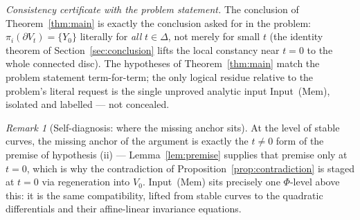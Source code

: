 \documentclass[11pt]{article}
\theoremstyle{definition}
\theoremstyle{remark}
\newtheorem{rmk}[thm]{Remark}
\begin{document}
\emph{Consistency certificate with the problem statement.} The
conclusion of Theorem~\ref{thm:main} is exactly the conclusion asked
for in the problem: $\pi_i(\partial V_t) = \{Y_0\}$ literally for
\emph{all} $t \in \Delta$, not merely for small $t$ (the identity
theorem of Section~\ref{sec:conclusion} lifts the local constancy near
$t = 0$ to the whole connected disc). The hypotheses of
Theorem~\ref{thm:main} match the problem statement term-for-term; the
only logical residue relative to the problem's literal request is the
single unproved analytic input Input~(Mem), isolated and labelled ---
not concealed.

\begin{rmk}[Self-diagnosis: where the missing anchor sits]
At the level of stable curves, the missing anchor of the argument is
exactly the $t \neq 0$ form of the premise of hypothesis (ii) ---
Lemma~\ref{lem:premise} supplies that premise only at $t = 0$, which is
why the contradiction of Proposition~\ref{prop:contradiction} is staged
at $t = 0$ via regeneration into $V_0$. Input~(Mem) sits precisely one
$\Phi$-level above this: it is the same compatibility, lifted from
stable curves to the quadratic differentials and their affine-linear
invariance equations.
\end{rmk}
\end{document}
